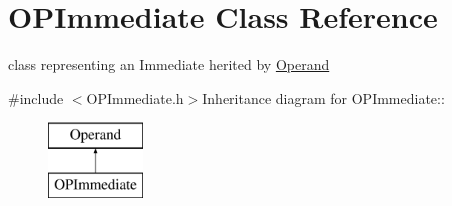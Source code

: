 \hypertarget{classOPImmediate}{
\section{OPImmediate Class Reference}
\label{classOPImmediate}
}


class representing an Immediate herited by \hyperlink{classOperand}{Operand}  


{\ttfamily \#include $<$OPImmediate.h$>$}Inheritance diagram for OPImmediate::\begin{figure}[H]
\begin{center}
\leavevmode
\includegraphics[height=2cm]{classOPImmediate}
\end{center}
\end{figure}
